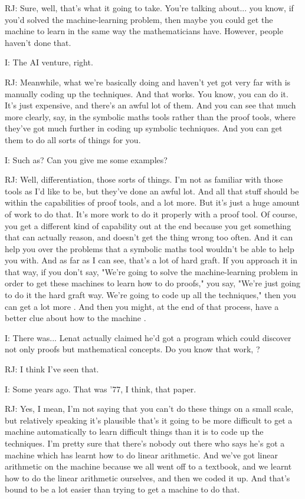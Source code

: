 \documentclass[10pt,titlepage]{book}
\begin{document}
RJ: Sure, well, that's what it going to take. You're talking about... you know, if you'd solved the machine-learning problem, then maybe you could get the machine to learn in the same way the mathematicians have. However, people haven't done that.

I: The AI venture, right.

RJ: Meanwhile, what we're basically doing and haven't yet got very far with is manually coding up the techniques. And that works. You know, you can do it. It's just expensive, and there's an awful lot of them. And you can see that much more clearly, say, in the symbolic maths tools rather than the proof tools, where they've got much further in coding up symbolic techniques. And you can get them to do all sorts of things for you.

I: Such as? Can you give me some examples?

RJ: Well, differentiation, those sorts of things. I'm not as familiar with those tools as I'd like to be, but they've done an awful lot. And all that stuff should be within the capabilities of proof tools, and a lot more. But it's just a huge amount of work to do that. It's more work to do it properly with a proof tool. Of course, you get a different kind of capability out at the end because you get something that can actually reason, and doesn't get the thing wrong too often. And it can help you over the problems that a symbolic maths tool wouldn't be able to help you with. And as far as I can see, that's a lot of hard graft. If you approach it in that way, if you don't say, "We're going to solve the machine-learning problem in order to get these machines to learn how to do proofs," you say, "We're just going to do it the hard graft way. We're going to code up all the techniques," then you can get a lot more 	. And then you might, at the end of that process, have a better clue about how to 	the machine	.

I: There was... Lenat actually claimed he'd got a program which could discover not only proofs but mathematical concepts. Do you know that work,	?

RJ: I think I've seen that.

I: Some years ago. That was '77, I think, that paper.

RJ: Yes, I mean, I'm not saying that you can't do these things on a small scale, but relatively speaking it's plausible that's it going to be more difficult to get a machine automatically to learn difficult things than it is to code up the techniques. I'm pretty sure that there's nobody out there who says he's got a machine which has learnt how to do linear arithmetic. And we've got linear arithmetic on the machine because we all went off to a textbook, and we learnt how to do the linear arithmetic ourselves, and then we coded it up. And that's bound to be a lot easier than trying to get a machine to do that.
\end{document}
